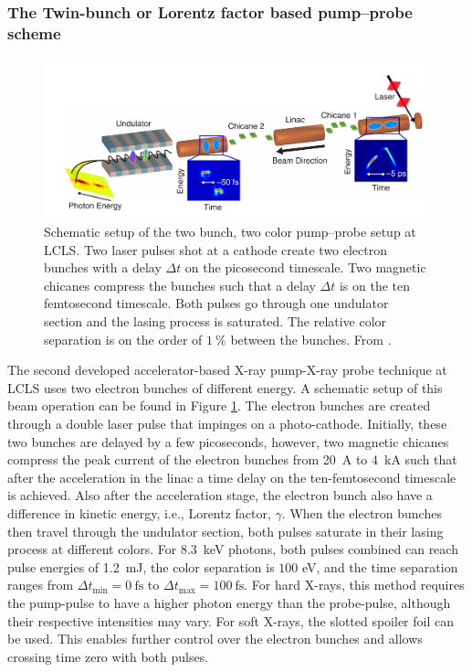 \subsubsection{The Twin-bunch or Lorentz factor based pump--probe scheme}\label{sec:twin-bunch-pump-probe}
\begin{figure}
	\centering
		\includegraphics[width=1.00\textwidth]{images/Agos-pump-probe-scheme.png}
	\caption[Schematic setup of a bunch based pump-probe setup.]{Schematic setup of the two bunch, two color pump--probe setup at LCLS. Two laser pulses shot at a cathode create two electron bunches with a delay $\Delta t$ on the picosecond timescale. Two magnetic chicanes compress the bunches such that a delay $\Delta t$ is on the ten femtosecond timescale. Both pulses go through one undulator section and the lasing process is saturated. The relative color separation is on the order of $\SI{1}{\percent}$ between the bunches. From \citep[\href{http://creativecommons.org/licenses/by/4.0/}{\ccby}]{Marinelli-2015-NatComm}.}
	\label{fig:Agos-pump-probe-scheme}
\end{figure}
The second developed accelerator-based X-ray pump-X-ray probe technique at LCLS \citep{Marinelli-2015-NatComm} uses two electron bunches of different energy. A schematic setup of this beam operation can be found in Figure \ref{fig:Agos-pump-probe-scheme}. The electron bunches are created through a double laser pulse that impinges on a photo-cathode. Initially, these two bunches are delayed by a few picoseconds, however, two magnetic chicanes compress the peak current of the electron bunches from \SI{20}{\ampere} to \SI{4}{\kilo\ampere} such that after the acceleration in the linac a time delay on the ten-femtosecond timescale is achieved. Also after the acceleration stage, the electron bunch also have a difference in kinetic energy, i.e., Lorentz factor, $\gamma$. When the electron bunches then travel through the undulator section, both pulses saturate in their lasing process at different colors. For \SI{8.3}{\kilo\electronvolt} photons, both pulses combined can reach pulse energies of \SI{1.2}{\milli\joule}, the color separation is $100$ eV, and the time separation ranges from $\Delta t_{\text{min}}=\SI{0}{\femto\second}$ to $\Delta t_{\text{max}}=\SI{100}{\femto\second}$. For hard X-rays, this method requires the pump-pulse to have a higher photon energy than the probe-pulse, although their respective intensities may vary. For soft X-rays, the slotted spoiler foil can be used. This enables further control over the electron bunches and allows crossing time zero with both pulses.
